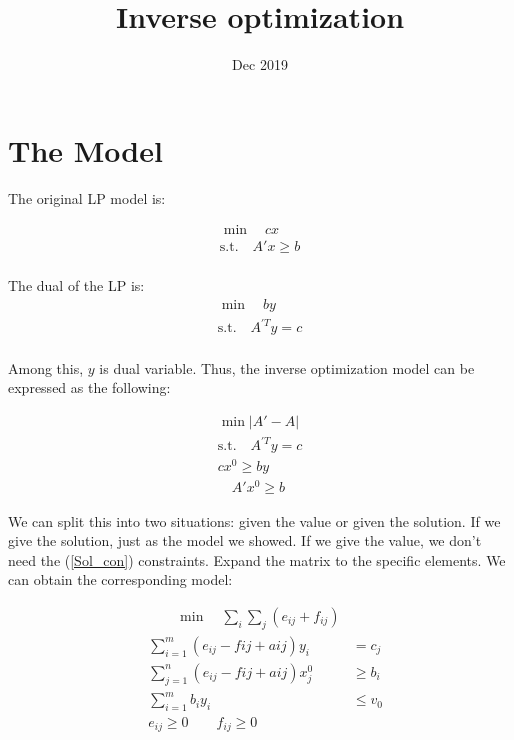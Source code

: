 \documentclass[UTF8]{article}
\title{Inverse optimization}
\date{Dec 2019}
\begin{document}
\maketitle{}

\section{The Model}

The original LP model is:

\begin{align*}
  \min \quad cx \\
\text{s.t.} \quad A'x \geq b  \\
\end{align*}

The dual of the LP is:
\begin{align*}
  \min \quad by \\
\text{s.t.} \quad A^{'T}y = c  \\
\end{align*}

Among this, $y$ is dual variable.
Thus, the inverse optimization model can be expressed as the following:

\begin{align}
  \min \vert A'-A \vert \nonumber \\
\mathrm{s.t.}  \quad A^{'T}y = c  \\
  cx^0 \geq by  \\
  \quad A'x^0 \geq b \label{Sol_con}
\end{align}

We can split this into two situations: given the value or given the solution. If we give the solution, just as the model we showed. If we give the value, we don't need the (\ref{Sol_con}) constraints.
Expand the matrix to the specific elements. We can obtain the corresponding model:

\begin{equation}
\begin{align*}
&\qquad \min \quad \sum_i \sum_j (e_{ij}+f_{ij})\\
&\sum_{i=1}^m (e_{ij}-f{ij}+a{ij})y_i & = c_j \\
&\sum_{j=1}^n (e_{ij}-f{ij}+a{ij})x_j^0 & \geq b_i \\
&\sum_{i=1}^m b_i y_i & \leq v_0 \\
&e_{ij} \geq 0 \qquad f_{ij} \geq 0
\end{align*}
\end{equation}
\end{document}
